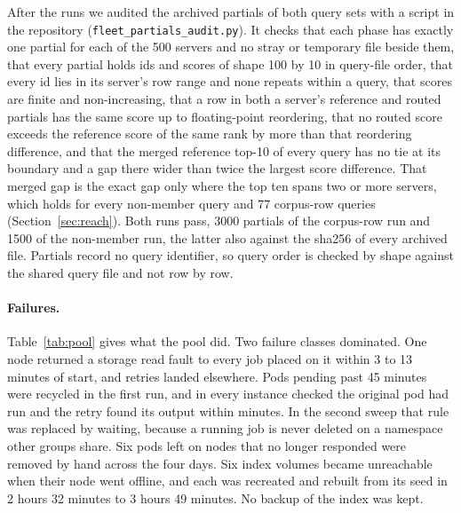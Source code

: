 \documentclass[sigconf, nonacm]{acmart}
\begin{document}
After the runs we audited the archived partials of both query sets with a script in the
repository (\texttt{fleet\_partials\_audit.py}). It checks that each phase has exactly one partial
for each of the 500 servers and no stray or temporary file beside them, that every partial holds
ids and scores of shape 100 by 10 in query-file order, that every id lies in its server's row
range and none repeats within a query, that scores are finite and non-increasing, that a row in
both a server's reference and routed partials has the same score up to floating-point reordering,
that no routed score exceeds the reference score of the same rank by more than that reordering
difference, and that the merged reference
top-10 of every query has no tie at its boundary and a gap there wider than twice the largest
score difference. That merged gap is the exact gap only where the top ten spans two or more
servers, which holds for every non-member query and 77 corpus-row queries
(Section~\ref{sec:reach}). Both runs pass, 3000 partials of the corpus-row run and 1500 of the non-member
run, the latter also against the sha256 of every archived file. Partials record no query
identifier, so query order is checked by shape against the shared query file and not row by row.

\paragraph{Failures.} Table~\ref{tab:pool} gives what the pool did. Two failure classes dominated.
One node returned a storage read fault to every job placed on it within 3 to 13 minutes of start,
and retries landed elsewhere. Pods pending past 45 minutes were recycled in the first run, and in
every instance checked the original pod had run and the retry found its output within minutes. In
the second sweep that rule was replaced by waiting, because a running job is never deleted on a
namespace other groups share. Six pods left on nodes that no longer responded were removed by
hand across the four days. Six index volumes became unreachable when their node went offline, and
each was recreated and rebuilt from its seed in 2 hours 32 minutes to 3 hours 49 minutes. No backup
of the index was kept.
\end{document}
